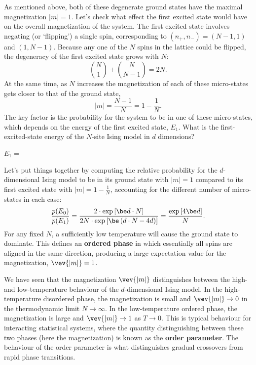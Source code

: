 As mentioned above, both of these degenerate ground states have the maximal magnetization $|m| = 1$.
Let's check what effect the first excited state would have on the overall magnetization of the system.
The first excited state involves negating (or `flipping') a single spin, corresponding to $(n_+, n_-) = (N - 1, 1)$ and $(1, N - 1)$.
Because any one of the $N$ spins in the lattice could be flipped, the degeneracy of the first excited state grows with $N$:
\begin{equation*}
  \binom{N}{1} + \binom{N}{N - 1} = 2N.
\end{equation*}
At the same time, as $N$ increases the magnetization of each of these micro-states gets closer to that of the ground state,
\begin{equation*}
  |m| = \frac{N - 1}{N} = 1 - \frac{1}{N}.
\end{equation*}
The key factor is the probability for the system to be in one of these micro-states, which depends on the energy of the first excited state, $E_1$.
What is the first-excited-state energy of the $N$-site Ising model in $d$ dimensions?
\begin{mdframed}
  $\displaystyle E_1 = $ \\[100 pt]
\end{mdframed}

Let's put things together by computing the relative probability for the $d$-dimensional Ising model to be in its ground state with $|m| = 1$ compared to its first excited state with $|m| = 1 - \frac{1}{N}$, accounting for the different number of micro-states in each case:
\begin{equation*}
  \frac{p(E_0)}{p(E_1)} = \frac{2\cdot \exp\left[\be d\cdot N\right]}{2N\cdot \exp\left[\be \left(d\cdot N - 4d\right)\right]} = \frac{\exp\left[4\be d\right]}{N}.
\end{equation*}
For any fixed $N$, a sufficiently low temperature will cause the ground state to dominate.
This defines an \textbf{ordered phase} in which essentially all spins are aligned in the same direction, producing a large expectation value for the magnetization, $\vev{|m|} = 1$.

We have seen that the magnetization $\vev{|m|}$ distinguishes between the high- and low-temperature behaviour of the $d$-dimensional Ising model.
In the high-temperature disordered phase, the magnetization is small and $\vev{|m|} \to 0$ in the thermodynamic limit $N \to \infty$.
In the low-temperature ordered phase, the magnetization is large and $\vev{|m|} \to 1$ as $T \to 0$.
This is typical behaviour for interacting statistical systems, where the quantity distinguishing between these two phases (here the magnetization) is known as the \textbf{order parameter}.
The behaviour of the order parameter is what distinguishes gradual crossovers from rapid phase transitions.

